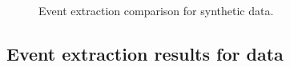 \documentclass[a4paper,11pt]{article}
\begin{document}
\begin{figure}[!htb]
{		\label{fig:events_2_5}
	}%
	\caption{Event extraction comparison for synthetic data.}
	\label{fig:events_set_synthetic}
\end{figure}

\newpage

\subsection{Event extraction results for  data}
\end{document}
